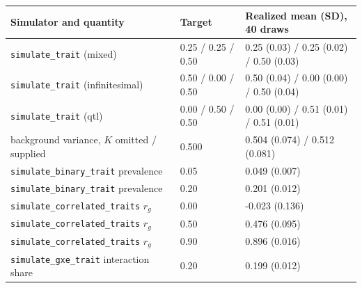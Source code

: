 \begin{tabular}{lll}
\toprule
Simulator and quantity & Target & Realized mean (SD), 40 draws \\
\midrule
\texttt{simulate\_trait} (mixed) & 0.25 / 0.25 / 0.50 & 0.25 (0.03) / 0.25 (0.02) / 0.50 (0.03) \\
\texttt{simulate\_trait} (infinitesimal) & 0.50 / 0.00 / 0.50 & 0.50 (0.04) / 0.00 (0.00) / 0.50 (0.04) \\
\texttt{simulate\_trait} (qtl) & 0.00 / 0.50 / 0.50 & 0.00 (0.00) / 0.51 (0.01) / 0.51 (0.01) \\
background variance, $K$ omitted / supplied & 0.500 & 0.504 (0.074) / 0.512 (0.081) \\
\texttt{simulate\_binary\_trait} prevalence & 0.05 & 0.049 (0.007) \\
\texttt{simulate\_binary\_trait} prevalence & 0.20 & 0.201 (0.012) \\
\texttt{simulate\_correlated\_traits} $r_g$ & 0.00 & -0.023 (0.136) \\
\texttt{simulate\_correlated\_traits} $r_g$ & 0.50 & 0.476 (0.095) \\
\texttt{simulate\_correlated\_traits} $r_g$ & 0.90 & 0.896 (0.016) \\
\texttt{simulate\_gxe\_trait} interaction share & 0.20 & 0.199 (0.012) \\
\bottomrule
\end{tabular}
